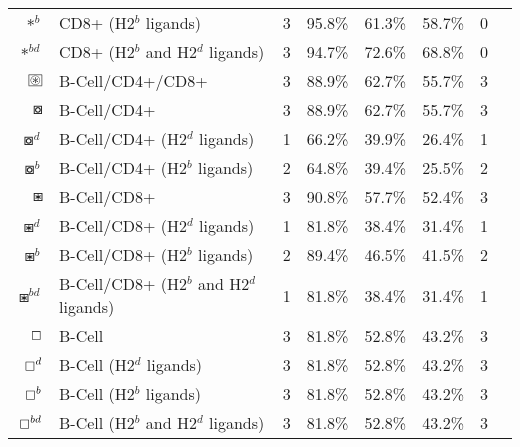 \begin{tabular}{rllccccc}
                                          $ \ast^b $ &                    CD8+ (H2$^b$ ligands) &            3 &         95.8\% &          61.3\% &         58.7\% &                          0 \\
                                       $ \ast^{bd} $ &         CD8+ (H2$^b$ and H2$^d$ ligands) &            3 &         94.7\% &          72.6\% &         68.8\% &                          0 \\
 $ \setlength{\fboxsep}{0.5pt} \boxed{\circledast} $ &                         B-Cell/CD4+/CD8+ &            3 &         88.9\% &          62.7\% &         55.7\% &                          3 \\
                                      $ \boxcircle $ &                              B-Cell/CD4+ &            3 &         88.9\% &          62.7\% &         55.7\% &                          3 \\
                                    $ \boxcircle^d $ &             B-Cell/CD4+ (H2$^d$ ligands) &            1 &         66.2\% &          39.9\% &         26.4\% &                          1 \\
                                    $ \boxcircle^b $ &             B-Cell/CD4+ (H2$^b$ ligands) &            2 &         64.8\% &          39.4\% &         25.5\% &                          2 \\
                                         $ \boxast $ &                              B-Cell/CD8+ &            3 &         90.8\% &          57.7\% &         52.4\% &                          3 \\
                                       $ \boxast^d $ &             B-Cell/CD8+ (H2$^d$ ligands) &            1 &         81.8\% &          38.4\% &         31.4\% &                          1 \\
                                       $ \boxast^b $ &             B-Cell/CD8+ (H2$^b$ ligands) &            2 &         89.4\% &          46.5\% &         41.5\% &                          2 \\
                                    $ \boxast^{bd} $ &  B-Cell/CD8+ (H2$^b$ and H2$^d$ ligands) &            1 &         81.8\% &          38.4\% &         31.4\% &                          1 \\
                                       $ \boxempty $ &                                   B-Cell &            3 &         81.8\% &          52.8\% &         43.2\% &                          3 \\
                                     $ \boxempty^d $ &                  B-Cell (H2$^d$ ligands) &            3 &         81.8\% &          52.8\% &         43.2\% &                          3 \\
                                     $ \boxempty^b $ &                  B-Cell (H2$^b$ ligands) &            3 &         81.8\% &          52.8\% &         43.2\% &                          3 \\
                                  $ \boxempty^{bd} $ &       B-Cell (H2$^b$ and H2$^d$ ligands) &            3 &         81.8\% &          52.8\% &         43.2\% &                          3 \\
\bottomrule
\end{tabular}
